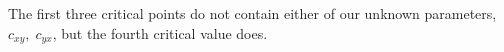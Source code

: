 The first three critical points do not contain either of our unknown parameters, $c_{xy},\;c_{yx}$, but the fourth critical value does.
